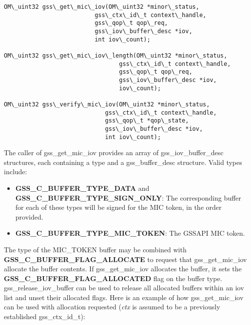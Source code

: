 \documentclass[letterpaper,10pt,english]{sphinxmanual}
\begin{document}
\begin{Verbatim}[commandchars=\\\{\}]
OM\_uint32 gss\_get\_mic\_iov(OM\_uint32 *minor\_status,
                          gss\_ctx\_id\_t context\_handle,
                          gss\_qop\_t qop\_req,
                          gss\_iov\_buffer\_desc *iov,
                          int iov\_count);

OM\_uint32 gss\_get\_mic\_iov\_length(OM\_uint32 *minor\_status,
                                 gss\_ctx\_id\_t context\_handle,
                                 gss\_qop\_t qop\_req,
                                 gss\_iov\_buffer\_desc *iov,
                                 iov\_count);

OM\_uint32 gss\_verify\_mic\_iov(OM\_uint32 *minor\_status,
                             gss\_ctx\_id\_t context\_handle,
                             gss\_qop\_t *qop\_state,
                             gss\_iov\_buffer\_desc *iov,
                             int iov\_count);
\end{Verbatim}

The caller of gss\_get\_mic\_iov provides an array of gss\_iov\_buffer\_desc
structures, each containing a type and a gss\_buffer\_desc structure.
Valid types include:
\begin{itemize}
\item {} 
\textbf{GSS\_C\_BUFFER\_TYPE\_DATA} and \textbf{GSS\_C\_BUFFER\_TYPE\_SIGN\_ONLY}: The
corresponding buffer for each of these types will be signed for the
MIC token, in the order provided.

\item {} 
\textbf{GSS\_C\_BUFFER\_TYPE\_MIC\_TOKEN}: The GSSAPI MIC token.

\end{itemize}

The type of the MIC\_TOKEN buffer may be combined with
\textbf{GSS\_C\_BUFFER\_FLAG\_ALLOCATE} to request that gss\_get\_mic\_iov
allocate the buffer contents.  If gss\_get\_mic\_iov allocates the
buffer, it sets the \textbf{GSS\_C\_BUFFER\_FLAG\_ALLOCATED} flag on the buffer
type.  gss\_release\_iov\_buffer can be used to release all allocated
buffers within an iov list and unset their allocated flags.  Here is
an example of how gss\_get\_mic\_iov can be used with allocation
requested (\emph{ctx} is assumed to be a previously established
gss\_ctx\_id\_t):
\end{document}
